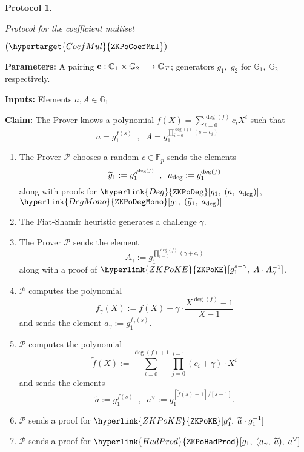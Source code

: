 \documentclass[11pt, lettersize, notitlepage, leqno, footskip=0.6cm]{article}
\newcommand{\bFp}{\mathbb{F}_p}
\newcommand{\lra}{\longrightarrow}
\newcommand{\wti}{\widetilde}
\newcommand{\mc}{\mathcal}
\newcommand{\mb}{\mathbb}
\newcommand{\mP}{\mc{P}}
\newcommand{\vs}{\vspace{-0.15cm}}
\newcommand{\noin}{\noindent}
\newtheorem{Prot}[Thm]{Protocol}
\numberwithin{equation}{section}
\begin{document}
\begin{mdframed}
\begin{Prot} \hypertarget{CoefMul}{Protocol for the coefficient multiset} $(\hypertarget{CoefMul}{\tt{ZKPoCoefMul}})$ \end{Prot}  

\noin \textbf{Parameters:} A pairing ${\bf{e}}:\mb{G}_1\times \mb{G}_2\lra \mb{G}_T$; generators $g_1,\;g_2$ for $\mb{G}_1,\; \mb{G}_2$ respectively. 


\noin \textbf{Inputs:} Elements $a, A \in \mb{G}_1$

\noin \textbf{Claim:} The Prover knows a polynomial $f(X) = \sum\limits_{i=0}^{\deg(f)} c_iX^i$ such that \vs $$ a = g_1^{f(s)}\;\;,\;\;A = g_1^{\prod\limits_{i=0}^{\deg(f)} (s+c_i) } $$

\begin{enumerate}[wide, labelwidth=!, labelindent=0pt, itemsep=-0.2ex] 

\item The Prover $\mP$ chooses a random $c\in \bFp$ sends the elements \vs $$\wti{g}_1:= g_1^{s^{\deg(f)}}\;\;,\;\;a_{\deg}:= g_1^{\deg(f)} \vs $$ along with proofs for $\hyperlink{Deg}{\tt{ZKPoDeg}}[g_1,\;(a,\;a_{\deg})]$, $\hyperlink{DegMono}{\tt{ZKPoDegMono}}[g_1,\;(\wti{g}_1,\;a_{\deg})]$

\item The Fiat-Shamir heuristic generates a challenge $\gamma$.

\item The Prover $\mP$ sends the element \vs $$A_{\gamma}:= g_1^{\prod\limits_{i=0}^{\deg(f)} (\gamma +c_i) } $$ along with a proof of $\hyperlink{ZKPoKE}{\tt{ZKPoKE}}[g_1^{s-\gamma},\; A\cdot A_{\gamma}^{-1}]$.

\item $\mP$ computes the polynomial \vs $$ f_{\gamma}(X):= f(X) + \gamma\cdot \frac{X^{\deg(f)}-1}{X-1} $$ and sends the element $a_{\gamma}:= g_1^{f_{\gamma}(s)}$.

\item $\mP$ computes the polynomial \vspace{-2mm} $$ \wti{f}(X):= \sum\limits_{i=0}^{\deg(f)+1} \prod\limits_{j=0}^{i-1} (c_i+\gamma)\cdot  X^i  $$ and sends the elements \vs $$\wti{a}:= g_1^{\wti{f}(s)}\;\;,\;\;a^{\vee}:= g_1^{[\wti{f}(s)-1]\big/[s-1]} .$$

\item $\mP$ sends a proof for $\hyperlink{ZKPoKE}{\tt{ZKPoKE}}[g_1^{s},\;\wti{a}\cdot g_1^{-1}] $

\item $\mP$ sends a proof for $\hyperlink{HadProd}{\tt{ZKPoHadProd}}[g_1,\;({a}_{\gamma},\;\wti{a}),\;a^{\vee}] $


\end{enumerate}
\end{mdframed}
\end{document}
